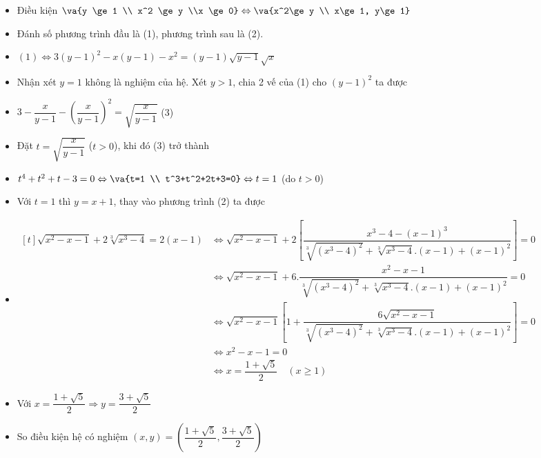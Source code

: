 \lgi 
\begin{itemize}[label=,leftmargin=*]
\item Điều kiện $\va{y \ge 1 \\ x^2 \ge y \\x \ge 0} \Leftrightarrow \va{x^2\ge y \\ x\ge 1, y\ge 1}$
\item Đánh số phương trình đầu là (1), phương trình sau là (2).
\item $(1)\Leftrightarrow 3(y-1)^2-x(y-1)-x^2=(y-1)\sqrt{y-1}\sqrt{x}$
\item Nhận xét $y=1$ không là nghiệm của hệ. Xét $y>1$, chia 2 vế của (1) cho $(y-1)^2$ ta được
\item $3-\dfrac{x}{y-1}-\left(\dfrac{x}{y-1} \right)^2=\sqrt{\dfrac{x}{y-1}}$ (3)
\item Đặt $t=\sqrt{\dfrac{x}{y-1}}$ ($t>0$), khi đó (3) trở thành
\item $t^4+t^2+t-3=0 \Leftrightarrow \va{t=1 \\ t^3+t^2+2t+3=0}\Leftrightarrow t=1$ (do $t>0$)
\item Với $t=1$ thì $y=x+1$, thay vào phương trình (2) ta được
\item $\begin{aligned}[t]\sqrt{x^2-x-1}+2\sqrt[3]{x^3-4}=2(x-1)&\Leftrightarrow \sqrt{x^2-x-1}+2\left[\dfrac{x^3-4-(x-1)^3}{\sqrt[3]{(x^3-4)^2}+\sqrt[3]{x^3-4}.(x-1)+(x-1)^2} \right] =0
\\
& \Leftrightarrow \sqrt{x^2-x-1}+6.\dfrac{x^2-x-1}{\sqrt[3]{(x^3-4)^2}+\sqrt[3]{x^3-4}.(x-1)+(x-1)^2} =0
\\
&\Leftrightarrow \sqrt{x^2-x-1}\left[  1+ \dfrac{6\sqrt{x^2-x-1}}{\sqrt[3]{(x^3-4)^2}+\sqrt[3]{x^3-4}.(x-1)+(x-1)^2}    \right]=0
\\
&\Leftrightarrow x^2-x-1=0
\\
&\Leftrightarrow x=\dfrac{1+\sqrt{5}}{2} \quad (x\ge 1	)
\end{aligned}$
\item Với $x=\dfrac{1+\sqrt{5}}{2}\Rightarrow y=\dfrac{3+\sqrt{5}}{2}$
\item So điều kiện hệ có nghiệm $(x,y)=\left(\dfrac{1+\sqrt{5}}{2},\dfrac{3+\sqrt{5}}{2} \right)$
\end{itemize}

